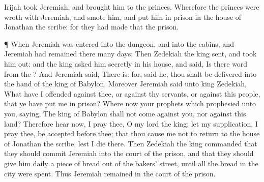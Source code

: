 {Irijah
took
Jeremiah, and
brought him to the
princes.
Wherefore the
princes were
wroth with
Jeremiah, and
smote him, and
put him in
prison in the
house of
Jonathan the
scribe: for they had
made that the
prison.
\par }{\PP {}¶ When
Jeremiah was
entered into the
dungeon, and into the
cabins, and
Jeremiah had
remained there
many
days;
Then
Zedekiah the
king
sent, and took him
out: and the
king
asked him
secretly in his
house, and
said, Is there
{}
word from the
{}? And
Jeremiah
said, There
is: for,
said he, thou shalt be
delivered into the
hand of the
king of
Babylon.
Moreover
Jeremiah
said unto
king
Zedekiah, What have I
offended against thee, or against thy
servants, or against this
people, that ye have
put me in
prison?
Where
{}
now your
prophets which
prophesied unto you,
saying, The
king of
Babylon shall not
come against you, nor against this
land?
Therefore
hear now, I pray thee, O my
lord the
king: let my
supplication, I pray thee, be
accepted
before thee; that thou cause me not to
return to the
house of
Jonathan the
scribe, lest I
die there.
Then
Zedekiah the
king
commanded that they should
commit
Jeremiah into the
court of the
prison, and that they should
give him
daily a
piece of
bread out of the
bakers’
street, until all the
bread in the
city were
spent. Thus
Jeremiah
remained in the
court of the
prison.

}
